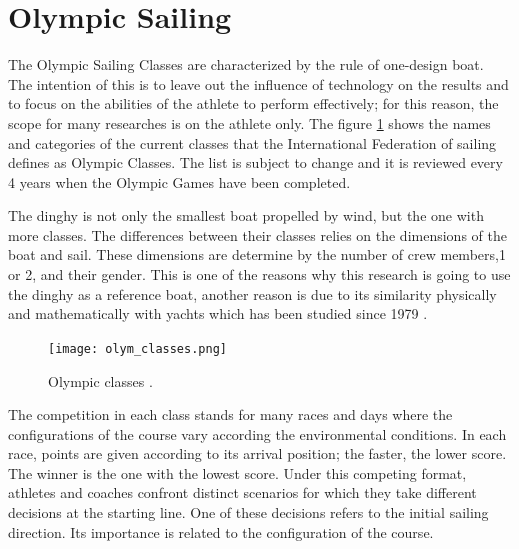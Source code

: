 \section {Olympic Sailing} \label{sec:olympic classes}
The Olympic Sailing Classes are characterized by the rule of one-design boat. The intention of this is to leave out the influence of technology on the results and to focus on the abilities of the athlete to perform effectively; for this reason, the scope for many researches is on the athlete only. The figure \ref{fig:olymp_cla} shows the names and categories of the current classes that the International Federation of sailing defines as Olympic Classes. The list is subject to change and it is reviewed every 4 years when the Olympic Games have been completed.\par 
The dinghy is not only the smallest boat propelled by wind, but the one with more classes. The differences between their classes relies on the dimensions of the boat and sail. These dimensions are determine by the number of crew members,1 or 2, and their gender. This is one of the reasons why this research is going to use the dinghy as a reference boat, another reason is due to its similarity physically and mathematically with yachts which has been studied since 1979 \cite{marchajaereo1979}. \par 

\begin{figure}[ht]
\centering
 \texttt{[image: olym\_classes.png]}
  \caption{Olympic classes \cite{sailoly}.}
\label{fig:olymp_cla} 
\end{figure}

The competition in each class stands for many races and days where the configurations of the course vary according the environmental conditions. In each race, points are given according to its arrival position; the faster, the lower score. The winner is the one with the lowest score. Under this competing format, athletes and coaches confront distinct scenarios for which they take different decisions at the starting line. One of these decisions refers to the initial sailing direction. Its importance is related to the configuration of the course.\par 

